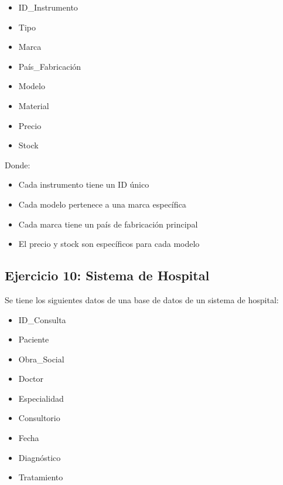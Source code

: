 \documentclass[12pt]{article}
\begin{document}
\begin{minipage}[t]{0.48\textwidth}
\begin{itemize}
    \item ID\_Instrumento
    \item Tipo
    \item Marca
    \item País\_Fabricación
\end{itemize}
\end{minipage}
\hfill
\begin{minipage}[t]{0.48\textwidth}
\begin{itemize}
    \item Modelo
    \item Material
    \item Precio
    \item Stock
\end{itemize}
\end{minipage}

\vspace{1em}

Donde:
\begin{itemize}
    \item Cada instrumento tiene un ID único
    \item Cada modelo pertenece a una marca específica
    \item Cada marca tiene un país de fabricación principal
    \item El precio y stock son específicos para cada modelo
\end{itemize}

\subsection{Ejercicio 10: Sistema de Hospital}
Se tiene los siguientes datos de una base de datos de un sistema de hospital:

\vspace{0.5em}

\begin{minipage}[t]{0.48\textwidth}
\begin{itemize}
    \item ID\_Consulta
    \item Paciente
    \item Obra\_Social
    \item Doctor
    \item Especialidad
\end{itemize}
\end{minipage}
\hfill
\begin{minipage}[t]{0.48\textwidth}
\begin{itemize}
    \item Consultorio
    \item Fecha
    \item Diagnóstico
    \item Tratamiento
\end{itemize}
\end{minipage}
\end{document}
